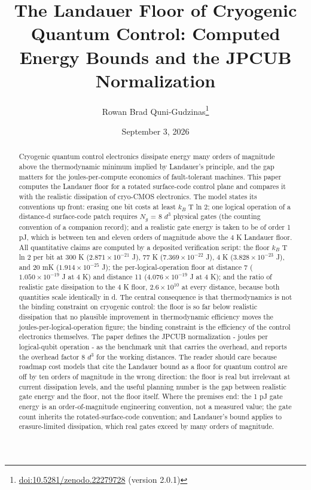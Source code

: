 \documentclass[11pt]{article}
\title{The Landauer Floor of Cryogenic Quantum Control: Computed Energy Bounds and the JPCUB Normalization}
\author{Rowan Brad Quni-Gudzinas\thanks{\href{https://doi.org/10.5281/zenodo.22279728}{doi:10.5281/zenodo.22279728} (version 2.0.1)}}
\date{September 3, 2026}
\begin{document}
\maketitle
\begin{abstract}
Cryogenic quantum control electronics dissipate energy many orders of magnitude above the thermodynamic minimum implied by Landauer's principle, and the gap matters for the joules-per-compute economics of fault-tolerant machines. This paper computes the Landauer floor for a rotated surface-code control plane and compares it with the realistic dissipation of cryo-CMOS electronics. The model states its conventions up front: erasing one bit costs at least $k_{B}$ T ln 2; one logical operation of a distance-d surface-code patch requires $N_{g}$ = 8 $d^{3}$ physical gates (the counting convention of a companion record); and a realistic gate energy is taken to be of order 1 pJ, which is between ten and eleven orders of magnitude above the 4 K Landauer floor. All quantitative claims are computed by a deposited verification script: the floor $k_{B}$ T ln 2 per bit at 300 K ($2.871\times 10^{-21}$ J), 77 K ($7.369\times 10^{-22}$ J), 4 K ($3.828\times 10^{-23}$ J), and 20 mK ($1.914\times 10^{-25}$ J); the per-logical-operation floor at distance 7 ($1.050\times 10^{-19}$ J at 4 K) and distance 11 ($4.076\times 10^{-19}$ J at 4 K); and the ratio of realistic gate dissipation to the 4 K floor, $2.6\times 10^{10}$ at every distance, because both quantities scale identically in d. The central consequence is that thermodynamics is not the binding constraint on cryogenic control: the floor is so far below realistic dissipation that no plausible improvement in thermodynamic efficiency moves the joules-per-logical-operation figure; the binding constraint is the efficiency of the control electronics themselves. The paper defines the JPCUB normalization - joules per logical-qubit operation - as the benchmark unit that carries the overhead, and reports the overhead factor 8 $d^{3}$ for the working distances. The reader should care because roadmap cost models that cite the Landauer bound as a floor for quantum control are off by ten orders of magnitude in the wrong direction: the floor is real but irrelevant at current dissipation levels, and the useful planning number is the gap between realistic gate energy and the floor, not the floor itself. Where the premises end: the 1 pJ gate energy is an order-of-magnitude engineering convention, not a measured value; the gate count inherits the rotated-surface-code convention; and Landauer's bound applies to erasure-limited dissipation, which real gates exceed by many orders of magnitude.
\end{abstract}
\end{document}
